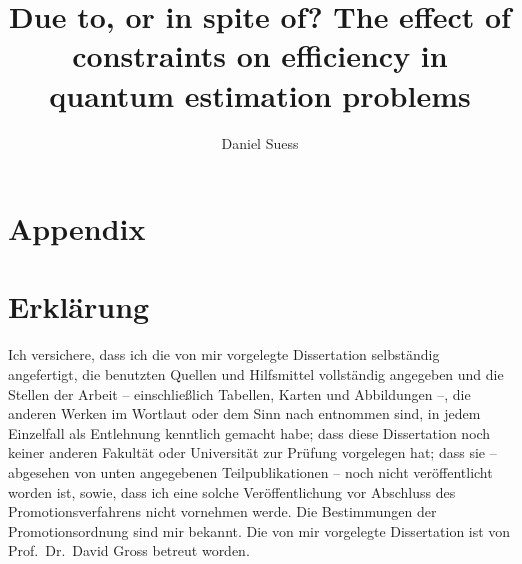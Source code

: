 \documentclass[a4paper,11pt,BCOR=8mm,twoside,headsepline]{scrbook}
\author{Daniel Suess}
\title{Due to, or in spite of? The effect of constraints on efficiency in quantum estimation problems}
\begin{document}
\frontmatter
\maketitle


\tableofcontents
\newpage
\makeatletter
\providecommand\@dotsep{5}
\makeatother
\listoftodos\relax
\newpage

\mainmatter







\appendix

\chapter{Appendix}%




\printbibliography[heading=bibintoc]


\newpage
\chapter*{Erklärung}

Ich versichere, dass ich die von mir vorgelegte Dissertation selbständig angefertigt, die benutzten Quellen und Hilfsmittel vollständig angegeben und die Stellen der Arbeit -- einschließlich Tabellen, Karten und Abbildungen --, die anderen Werken im Wortlaut oder dem Sinn nach entnommen sind, in jedem Einzelfall als Entlehnung kenntlich gemacht habe; dass diese Dissertation noch keiner anderen Fakultät oder Universität zur Prüfung vorgelegen hat; dass sie -- abgesehen von unten angegebenen Teilpublikationen -- noch nicht veröffentlicht worden ist, sowie, dass ich eine solche Veröffentlichung vor Abschluss des Promotionsverfahrens nicht vornehmen werde.
Die Bestimmungen der Promotionsordnung sind mir bekannt.
Die von mir vorgelegte Dissertation ist von Prof.\ Dr.\ David Gross betreut worden.
\end{document}
